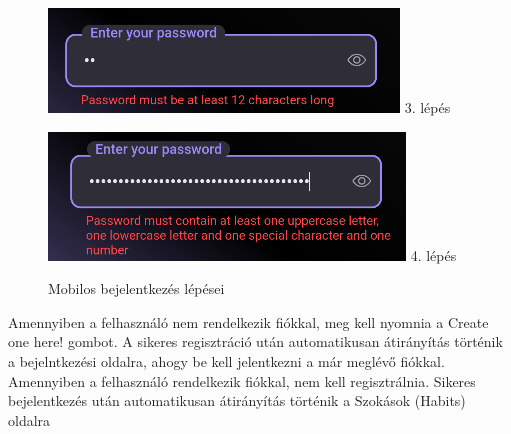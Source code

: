 \documentclass[12pt]{report}
\begin{document}
\begin{figure}[H]
\begin{minipage}[b]{0.23\textwidth}
        \centering
        \includegraphics[width=\linewidth]{src/loginpage3.png}
        3. lépés
    \end{minipage}
    \hfill
    \begin{minipage}[b]{0.23\textwidth}
        \centering
        \includegraphics[width=\linewidth]{src/loginpage4.png}
        4. lépés
    \end{minipage}
   Mobilos bejelentkezés lépései
    \label{fig:login-steps}
\end{figure}

Amennyiben a felhasználó nem rendelkezik fiókkal, meg kell nyomnia a Create one here! gombot.  A sikeres regisztráció után automatikusan átirányítás történik a bejelntkezési oldalra, ahogy be kell jelentkezni a már meglévő fiókkal. Amennyiben a felhasználó rendelkezik fiókkal, nem kell regisztrálnia. Sikeres bejelentkezés után automatikusan átirányítás történik a Szokások (Habits) oldalra
\end{document}
